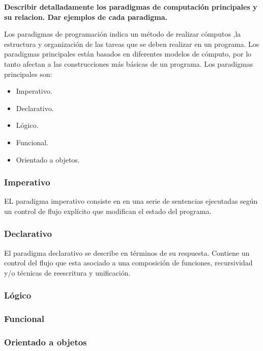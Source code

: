 \item \textbf{Describir detalladamente los paradigmas de computación principales y su relacion. Dar ejemplos de cada paradigma.}

Los paradigmas de programación indica un método de realizar cómputos ,la estructura y organización de las tareas que se deben realizar en un programa. Los paradigmas principales están basados en diferentes modelos de cómputo, por lo tanto afectan a las construcciones más básicas de un programa. Los paradigmas principales son:
\begin{itemize}
    \item Imperativo.
    \item Declarativo.
    \item Lógico.
    \item Funcional.
    \item Orientado a objetos.
\end{itemize}
\subsubsection*{Imperativo}
EL paradigma imperativo consiste en en una serie de sentencias ejecutadas según un control de flujo explícito que modifican el estado del programa.
\subsubsection*{Declarativo}
El paradigma declarativo se describe en términos de su respuesta. Contiene un control del flujo que esta asociado a una composición de funciones, recursividad y/o técnicas de reescritura y unificación.
\subsubsection*{Lógico}
\cite{satori_2021}
\subsubsection*{Funcional}
\subsubsection*{Orientado a objetos}